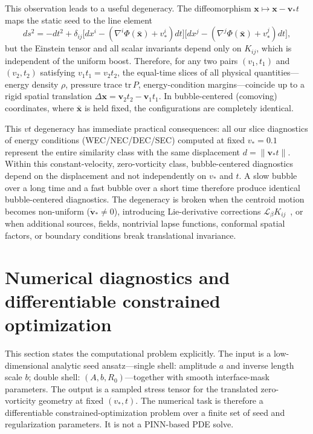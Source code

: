 \documentclass[11pt]{article}
\makeatletter
\newcommand{\@abbr}[1]{\ifmmode\mathrm{#1}\else\textsc{#1}\fi}
\newcommand{\WEC}{\@abbr{WEC}}
\newcommand{\NEC}{\@abbr{NEC}}
\newcommand{\SEC}{\@abbr{SEC}}
\newcommand{\DEC}{\@abbr{DEC}}
\makeatother
\begin{document}
This observation leads to a useful degeneracy. The diffeomorphism $\mathbf x\mapsto\mathbf x-\mathbf v_* t$ maps the static seed to the line element
\[
ds^2=-dt^2+\delta_{ij}\big[dx^i-(\nabla^i\Phi(\bar{\mathbf x})+v_*^i)dt\big]\big[dx^j-(\nabla^j\Phi(\bar{\mathbf x})+v_*^j)dt\big],
\]
but the Einstein tensor and all scalar invariants depend only on $K_{ij}$, which is independent of the uniform boost. Therefore, for any two pairs $(v_1,t_1)$ and $(v_2,t_2)$ satisfying $v_1 t_1=v_2 t_2$, the equal-time slices of all physical quantities---energy density $\rho$, pressure trace $\mathrm{tr}\,P$, energy-condition margins---coincide up to a rigid spatial translation $\Delta\mathbf x=\mathbf v_2 t_2-\mathbf v_1 t_1$. In bubble-centered (comoving) coordinates, where $\bar{\mathbf x}$ is held fixed, the configurations are completely identical.

This $vt$ degeneracy has immediate practical consequences: all our slice diagnostics of energy conditions (\WEC/\NEC/\DEC/\SEC) computed at fixed $v_*=0.1$ represent the entire similarity class with the same displacement $d=\|\mathbf v_* t\|$. Within this constant-velocity, zero-vorticity class, bubble-centered diagnostics depend on the displacement and not independently on $v_*$ and $t$. A slow bubble over a long time and a fast bubble over a short time therefore produce identical bubble-centered diagnostics. The degeneracy is broken when the centroid motion becomes non-uniform ($\dot{\mathbf v}_*\neq0$), introducing Lie-derivative corrections $\mathcal{L}_\beta K_{ij}$~\cite{Santiago:2021aup}, or when additional sources, fields, nontrivial lapse functions, conformal spatial factors, or boundary conditions break translational invariance.


\section{Numerical diagnostics and differentiable constrained optimization}
\label{sec:numerics}

This section states the computational problem explicitly. The input is a low-dimensional analytic seed ansatz---single shell: amplitude $a$ and inverse length scale $b$; double shell: $(A,b,R_0)$---together with smooth interface-mask parameters. The output is a sampled stress tensor for the translated zero-vorticity geometry at fixed $(v_*,t)$. The numerical task is therefore a differentiable constrained-optimization problem over a finite set of seed and regularization parameters. It is not a PINN-based PDE solve.
\end{document}
